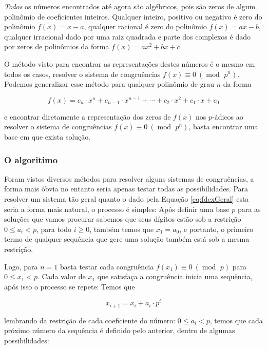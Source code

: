 \documentclass{report}
\DeclareMathOperator{\modulo}{mod \ }
\theoremstyle{definition}
\begin{document}
\emph{Todos} os números encontrados até agora são algébricos, pois são zeros de algum polinômio de coeficientes inteiros. Qualquer inteiro, positivo ou negativo é zero do polinômio $f(x) = x-a$, qualquer racional é zero do polinômio $f(x) = ax-b$, qualquer irracional dado por uma raiz quadrada e parte dos complexos é dado por zeros de polinômios da forma $f(x) = ax^2+bx+c$. 

O método visto para encontrar as representações destes números é o mesmo em todos os casos, resolver o sistema de congruências $f(x) \equiv 0 \ (\modulo p^n)$. Podemos generalizar esse método para qualquer polinômio de grau $n$ da forma

\begin{equation}\label{eq:fdexGeral}
    f(x) = c_n \cdot x^n + c_{n-1} \cdot x^{n-1} + \cdots + c_2 \cdot x^2 + c_1 \cdot x + c_0
\end{equation}

e encontrar diretamente a representação dos zeros de $f(x)$ nos $p$-ádicos ao resolver o sistema de congruências $f(x) \equiv 0 \ (\modulo p^n)$, basta encontrar uma base em que exista solução. 

\subsubsection{O algoritimo}

Foram vistos diversos métodos para resolver alguns sistemas de congruências, a forma mais óbvia no entanto seria apenas testar todas as possibilidades. Para resolver um sistema tão geral quanto o dado pela Equação \ref{eq:fdexGeral} esta seria a forma mais natural, o processo é simples: Após definir uma base $p$ para as soluções que vamos procurar sabemos que seus dígitos estão sob a restrição $0 \leq a_i < p$, para todo $i \geq 0$, também temos que $x_1 = a_0$, e portanto, o primeiro termo de qualquer sequência que gere uma solução também está sob a mesma restrição.

Logo, para $n = 1$ basta testar cada congruência $f(x_1) \equiv 0 \ (\modulo p)$ para $0 \leq x_1 < p$. Cada valor de $x_1$ que satisfaça a congruência inicia uma sequência, após isso o processo se repete: Temos que

\begin{equation}
    x_{i+1} = x_i + a_i \cdot p^i
\end{equation}

lembrando da restrição de cada coeficiente do número: $0 \leq a_i < p$, temos que cada próximo número da sequência é definido pelo anterior, dentro de algumas possibilidades:
\end{document}
